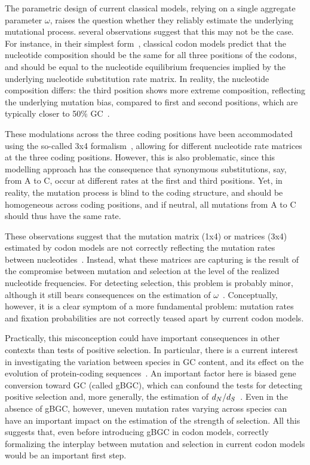 The parametric design of current classical models, relying on a single aggregate parameter $\omega$, raises the question whether they reliably estimate the underlying mutational process.
several observations suggest that this may not be the case.
For instance, in their simplest form~\citep{Muse1994, Goldman1994}, classical \gls{codon} models predict that the nucleotide composition should be the same for all three positions of the \glspl{codon}, and should be equal to the nucleotide equilibrium frequencies implied by the underlying nucleotide \gls{substitution} rate matrix.
In reality, the nucleotide composition differs: the third position shows more extreme composition, reflecting the underlying mutation bias, compared to first and second positions, which are typically closer to 50\% GC~\citep{Singer2000}.

These modulations across the three coding positions have been accommodated using the so-called 3x4 formalism~\citep{Goldman1994, Pond2005a}, allowing for different nucleotide rate matrices at the three coding positions.
However, this is also problematic, since this modelling approach has the consequence that \gls{synonymous} \glspl{substitution}, say, from A to C, occur at different rates at the first and third positions.
Yet, in reality, the mutation process is blind to the coding structure, and should be homogeneous across coding positions, and if \gls{neutral}, all mutations from A to C should thus have the same rate.

These observations suggest that the mutation matrix (1x4) or matrices (3x4) estimated by \gls{codon} models are not correctly reflecting the mutation rates between nucleotides~\citep{Rodrigue2008a}.
Instead, what these matrices are capturing is the result of the compromise between mutation and selection at the level of the realized nucleotide frequencies.
For detecting selection, this problem is probably minor, although it still bears consequences on the estimation of $\omega$~\citep{Spielman2015}.
Conceptually, however, it is a clear symptom of a more fundamental problem: mutation rates and fixation probabilities are not correctly teased apart by current \gls{codon} models.

Practically, this misconception could have important consequences in other contexts than tests of positive selection.
In particular, there is a current interest in investigating the variation between species in GC content, and its effect on the evolution of protein-coding sequences~\citep{Bolivar2019}.
An important factor here is biased gene conversion toward GC (called gBGC), which can confound the tests for detecting positive selection and, more generally, the estimation of $d_N / d_S$~\citep{Galtier2009,Ratnakumar2010, Figuet2014}.
Even in the absence of \acrshort{gBGC}, however, uneven mutation rates varying across species can have an important impact on the estimation of the strength of selection.
All this suggests that, even before introducing \acrshort{gBGC} in \gls{codon} models, correctly formalizing the interplay between mutation and selection in current \gls{codon} models would be an important first step.

